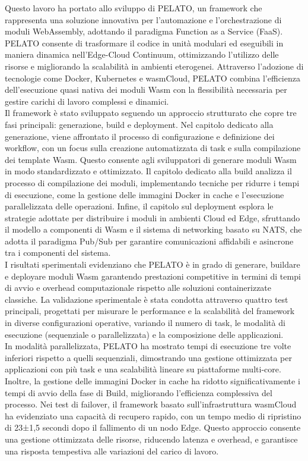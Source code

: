 Questo lavoro ha portato allo sviluppo di PELATO, un framework che rappresenta una soluzione innovativa per l’automazione e l’orchestrazione di moduli WebAssembly, adottando il paradigma Function as a Service (FaaS). PELATO consente di trasformare il codice in unità modulari ed eseguibili in maniera dinamica nell’Edge-Cloud Continuum, ottimizzando l’utilizzo delle risorse e migliorando la scalabilità in ambienti eterogenei. Attraverso l’adozione di tecnologie come Docker, Kubernetes e wasmCloud, PELATO combina l’efficienza dell’esecuzione quasi nativa dei moduli Wasm con la flessibilità necessaria per gestire carichi di lavoro complessi e dinamici.\\
Il framework è stato sviluppato seguendo un approccio strutturato che copre tre fasi principali: generazione, build e deployment. Nel capitolo dedicato alla generazione, viene affrontato il processo di configurazione e definizione dei workflow, con un focus sulla creazione automatizzata di task e sulla compilazione dei template Wasm. Questo consente agli sviluppatori di generare moduli Wasm in modo standardizzato e ottimizzato. Il capitolo dedicato alla build analizza il processo di compilazione dei moduli, implementando tecniche per ridurre i tempi di esecuzione, come la gestione delle immagini Docker in cache e l’esecuzione parallelizzata delle operazioni. Infine, il capitolo sul deployment esplora le strategie adottate per distribuire i moduli in ambienti Cloud ed Edge, sfruttando il modello a componenti di Wasm e il sistema di networking basato su NATS, che adotta il paradigma Pub/Sub per garantire comunicazioni affidabili e asincrone tra i componenti del sistema.\\
I risultati sperimentali evidenziano che PELATO è in grado di generare, buildare e deployare moduli Wasm garantendo prestazioni competitive in termini di tempi di avvio e overhead computazionale rispetto alle soluzioni containerizzate classiche. La validazione sperimentale è stata condotta attraverso quattro test principali, progettati per misurare le performance e la scalabilità del framework in diverse configurazioni operative, variando il numero di task, le modalità di esecuzione (sequenziale o parallelizzata) e la composizione delle applicazioni.\\
In modalità parallelizzata, PELATO ha mostrato tempi di esecuzione tre volte inferiori rispetto a quelli sequenziali, dimostrando una gestione ottimizzata per applicazioni con più task e una scalabilità lineare su piattaforme multi-core. Inoltre, la gestione delle immagini Docker in cache ha ridotto significativamente i tempi di avvio della fase di Build, migliorando l’efficienza complessiva del processo. Nei test di failover, il framework basato sull'infrastruttura wasmCloud ha evidenziato una capacità di recupero rapido, con un tempo medio di ripristino di 23±1,5 secondi dopo il fallimento di un nodo Edge. Questo approccio consente una gestione ottimizzata delle risorse, riducendo latenza e overhead, e garantisce una risposta tempestiva alle variazioni del carico di lavoro.\\
